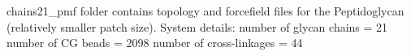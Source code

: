 chains21_pmf folder contains topology and forcefield files for the Peptidoglycan (relatively smaller patch size).
System details:
number of glycan chains = 21 
number of CG beads = 2098
number of cross-linkages = 44
